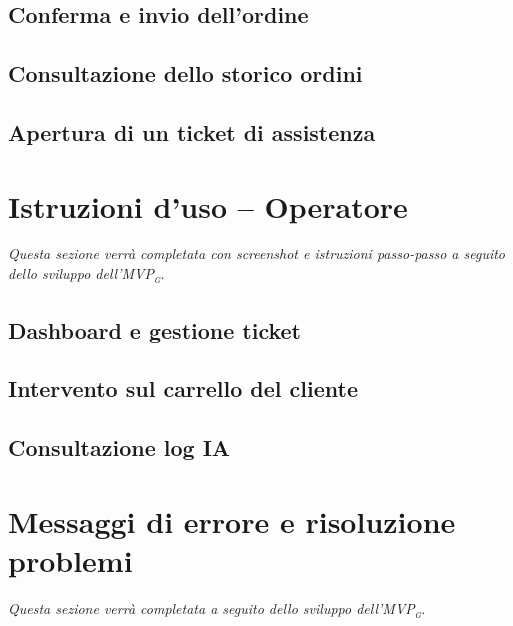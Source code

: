 \documentclass[a4paper, 11pt, oneside]{scrartcl}
\begin{document}
\subsection{Conferma e invio dell'ordine}

\subsection{Consultazione dello storico ordini}

\subsection{Apertura di un ticket di assistenza}

\newpage
\section{Istruzioni d'uso -- Operatore}
\textit{Questa sezione verr\`a completata con screenshot e istruzioni passo-passo a seguito dello sviluppo dell'MVP\textsubscript{\textsc{g}}.}

\subsection{Dashboard e gestione ticket}

\subsection{Intervento sul carrello del cliente}

\subsection{Consultazione log IA}

\newpage
\section{Messaggi di errore e risoluzione problemi}
\textit{Questa sezione verr\`a completata a seguito dello sviluppo dell'MVP\textsubscript{\textsc{g}}.}
\end{document}
